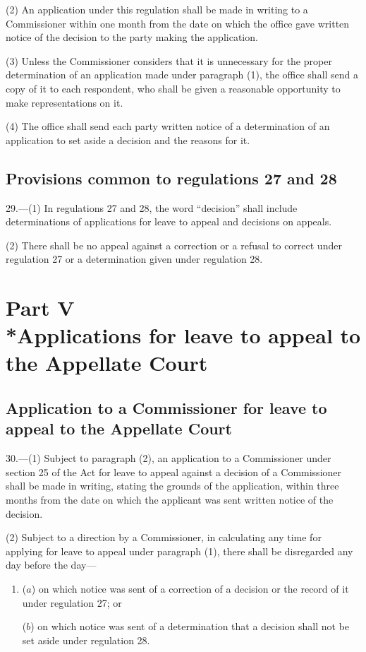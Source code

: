 \documentclass[12pt,a4paper]{article}
\begin{document}
(2) An application under this regulation shall be made in writing to a Commissioner within one month from the date on which the office gave written notice of the decision to the party making the application.

(3) Unless the Commissioner considers that it is unnecessary for the proper determination of an application made under paragraph (1), the office shall send a copy of it to each respondent, who shall be given a reasonable opportunity to make representations on it.

(4) The office shall send each party written notice of a determination of an application to set aside a decision and the reasons for it.

\subsection[29. Provisions common to regulations 27 and 28]{Provisions common to regulations 27 and 28}

29.—(1) In regulations 27 and 28, the word “decision” shall include determinations of applications for leave to appeal and decisions on appeals.

(2) There shall be no appeal against a correction or a refusal to correct under regulation 27 or a determination given under regulation 28.

\section[Part V --- Applications for leave to appeal to the Appellate Court]{Part V\\*Applications for leave to appeal to the Appellate Court}

\subsection[30. Application to a Commissioner for leave to appeal to the Appellate Court]{Application to a Commissioner for leave to appeal to the Appellate Court}

\renewcommand\parthead{--- Part V}

30.—(1) Subject to paragraph (2), an application to a Commissioner under section 25 of the Act for leave to appeal against a decision of a Commissioner shall be made in writing, stating the grounds of the application, within three months from the date on which the applicant was sent written notice of the decision.

(2) Subject to a direction by a Commissioner, in calculating any time for applying for leave to appeal under paragraph (1), there shall be disregarded any day before the day---
\begin{enumerate}\item[]
($a$) on which notice was sent of a correction of a decision or the record of it under regulation 27; or

($b$) on which notice was sent of a determination that a decision shall not be set aside under regulation 28.
\end{enumerate}
\end{document}
